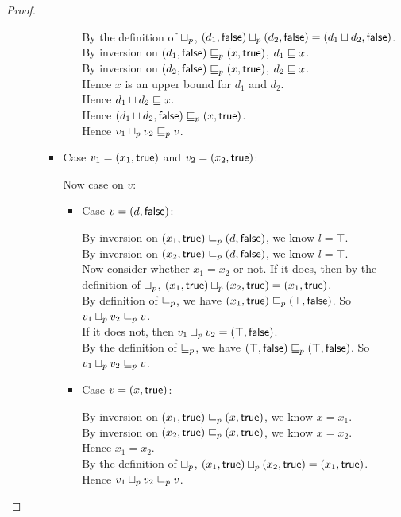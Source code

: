 \begin{proof}
\begin{enumerate}
\begin{enumerate}
\begin{itemize}
\begin{itemize}
       By the definition of $ \sqcup_p $, $(d_1, \textsf{false})  \sqcup_p  (d_2, \textsf{false}) = (d_1 \sqcup d_2, \textsf{false})$. \\ 
       By inversion on $(d_1, \textsf{false}) \sqsubseteq_p (x, \textsf{true})$,  $d_1 \sqsubseteq x$. \\
       By inversion on $(d_2, \textsf{false}) \sqsubseteq_p (x, \textsf{true})$,  $d_2 \sqsubseteq x$. \\
       Hence $x$ is an upper bound for $d_1$ and $d_2$. \\ 
       Hence $d_1 \sqcup d_2 \sqsubseteq x$. \\ 
       Hence $(d_1 \sqcup d_2, \textsf{false}) \sqsubseteq_p (x, \textsf{true})$. \\ 
       Hence $v_1 \sqcup_p v_2 \sqsubseteq_p v$. 
     \end{itemize}
  
   \item Case $v_1 = (x_1, \textsf{true})$ and $v_2 = (x_2, \textsf{true})$: 
  
     Now case on $v$: 
     \begin{itemize}
     \item Case $v = (d, \textsf{false})$: 
  
       By inversion on $(x_1, \textsf{true}) \sqsubseteq_p (d, \textsf{false})$, we know $l = \top$. \\
       By inversion on $(x_2, \textsf{true}) \sqsubseteq_p (d, \textsf{false})$, we know $l = \top$. \\
       Now consider whether $x_1 = x_2$ or not. 
       If it does, then  by the definition of $ \sqcup_p $, $(x_1, \textsf{true})  \sqcup_p  (x_2, \textsf{true}) = (x_1, \textsf{true})$. \\ 
       By definition of $\sqsubseteq_p$, we have $(x_1, \textsf{true}) \sqsubseteq_p (\top, \textsf{false})$. 
       So $v_1 \sqcup_p v_2 \sqsubseteq_p v$. \\ 
       If it does not, then $v_1 \sqcup_p v_2 = (\top, \textsf{false})$. \\ 
       By the definition of $\sqsubseteq_p$, we have $(\top, \textsf{false}) \sqsubseteq_p (\top, \textsf{false})$. 
       So $v_1 \sqcup_p v_2 \sqsubseteq_p v$. 
  
     \item Case $v = (x, \textsf{true})$: 
  
       By inversion on $(x_1, \textsf{true}) \sqsubseteq_p (x, \textsf{true})$, we know $x = x_1$. \\
       By inversion on $(x_2, \textsf{true}) \sqsubseteq_p (x, \textsf{true})$, we know $x = x_2$. \\
       Hence $x_1 = x_2$. \\ 
       By the definition of $ \sqcup_p $, $(x_1, \textsf{true})  \sqcup_p  (x_2, \textsf{true}) = (x_1, \textsf{true})$. \\
       Hence $v_1 \sqcup_p v_2 \sqsubseteq_p v$. 
     \end{itemize}
   

\end{itemize}
\end{enumerate}
\end{enumerate}
\end{proof}
